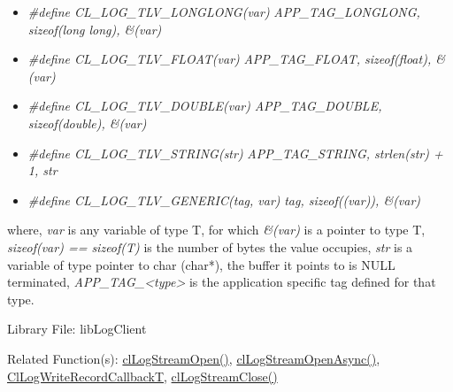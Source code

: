 \begin{flushleft}
\begin{itemize}
\begin{Desc}
\begin{itemize}
                  \newline \textit{APP\_\-TAG\_\-LONG, sizeof(long), \&(var)}
\item	\textit{\#define CL\_\-LOG\_\-TLV\_\-LONGLONG(var)                           }
                 \newline \textit{APP\_\-TAG\_\-LONGLONG, sizeof(long long), \&(var) }
\item	\textit{\#define CL\_\-LOG\_\-TLV\_\-FLOAT(var)                                      }
                  \newline \textit{APP\_\-TAG\_\-FLOAT, sizeof(float), \&(var)}
\item	\textit{\#define CL\_\-LOG\_\-TLV\_\-DOUBLE(var)                                  }
                  \newline \textit{APP\_\-TAG\_\-DOUBLE, sizeof(double), \&(var)}
\item	\textit{\#define CL\_\-LOG\_\-TLV\_\-STRING(str)                                     }
                  \newline \textit{APP\_\-TAG\_\-STRING, strlen(str) + 1, str}
\item	\textit{\#define CL\_\-LOG\_\-TLV\_\-GENERIC(tag, var)                           }
                   \newline \textit{tag, sizeof((var)), \&(var)}
    \end{itemize}
 where, \textit{var} is any variable of type T, 
 \newline for which \textit{\&(var)} is a pointer to type T, 
 \newline \textit{sizeof(var) == sizeof(T)} is the number of bytes the value occupies, 
 \newline \textit{str} is a variable of type pointer to char (char*),
 \newline the buffer it points to is NULL terminated,
 \newline \textit{APP\_\-TAG\_\-<type>} is the application specific tag defined for that type.

\end{Desc}
\begin{Desc}
\item[Library File:] libLogClient\end{Desc}
\begin{Desc}
\item[Related Function(s):]\hyperlink{pagelog105}{clLogStreamOpen()}, \hyperlink{pagelog106}{clLogStreamOpenAsync()}, 
\hyperlink{pagelog112}{ClLogWriteRecordCallbackT}, \hyperlink{pagelog108}{clLogStreamClose()}\end{Desc}
\newpage




\end{itemize}
\end{flushleft}
